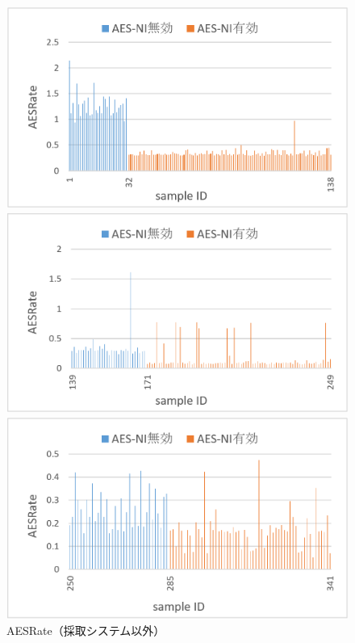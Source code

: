 \begin{figure}[H]
  \begin{minipage}[b]{0.5\linewidth}
    \centering
    \includegraphics[width=\textwidth,pagebox=cropbox]{fig/aes_rst_chrome.png}
  \end{minipage}
  \begin{minipage}[b]{0.5\linewidth}
    \centering
    \includegraphics[width=\textwidth,pagebox=cropbox]{fig/aes_rst_firefox.png}
  \end{minipage}
  \begin{minipage}[b]{0.5\linewidth}
    \centering
    \includegraphics[width=\textwidth,pagebox=cropbox]{fig/aes_rst_ie.png}
  \end{minipage}
  \caption{AESRate（採取システム以外）}\label{fig-aes_rst}
\end{figure}

